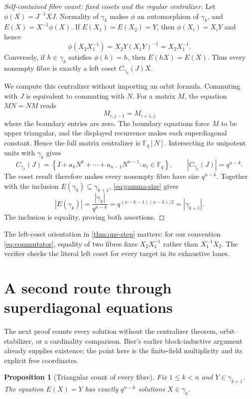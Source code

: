 \documentclass[10pt,a4paper]{amsart}
\newtheorem{proposition}[theorem]{Proposition}
\theoremstyle{definition}
\theoremstyle{remark}
\newcommand{\F}{\mathbb F}
\begin{document}
\begin{proof}[Self-contained fibre count: fixed cosets and the regular centralizer]
Let $\phi(X)=J^{-1}XJ$.  Normality of $\gamma_k$ makes $\phi$ an
automorphism of $\gamma_k$, and $E(X)=X^{-1}\phi(X)$.  If
$E(X_1)=E(X_2)=Y$, then $\phi(X_i)=X_iY$ and hence
\[
 \phi(X_2X_1^{-1})=X_2Y(X_1Y)^{-1}=X_2X_1^{-1}.
\]
Conversely, if $h\in\gamma_k$ satisfies $\phi(h)=h$, then
$E(hX)=E(X)$.  Thus every nonempty fibre is exactly a left coset
$C_{\gamma_k}(J)X$.

We compute this centralizer without importing an orbit formula.  Commuting
with $J$ is equivalent to commuting with $N$.  For a matrix $M$, the equation
$MN=NM$ reads
\[
                  M_{i,j-1}=M_{i+1,j}
\]
where the boundary entries are zero.  The boundary equations force $M$ to
be upper triangular, and the displayed recurrence makes each
superdiagonal constant.  Hence the full matrix centralizer is $\F_q[N]$.
Intersecting its unipotent units with $\gamma_k$ gives
\begin{equation}
 C_{\gamma_k}(J)
  =\left\{I+a_kN^k+\cdots+a_{n-1}N^{n-1}:a_i\in\F_q\right\},
 \qquad |C_{\gamma_k}(J)|=q^{n-k}.
 \label{eq:centralizer}
\end{equation}
The coset result therefore makes every nonempty fibre have size $q^{n-k}$.
Together with the inclusion $E(\gamma_k)\subseteq\gamma_{k+1}$,
\cref{eq:gamma-size} gives
\[
 |E(\gamma_k)|
  =\frac{|\gamma_k|}{q^{n-k}}
  =q^{(n-k-1)(n-k)/2}
  =|\gamma_{k+1}|.
\]
The inclusion is equality, proving both assertions.
\end{proof}

The left-coset orientation in \cref{thm:one-step} matters: for our
convention \eqref{eq:commutator}, equality of two fibres fixes
$X_2X_1^{-1}$ rather than $X_1^{-1}X_2$.  The verifier checks the literal
left coset for every target in its exhaustive lanes.

\section{A second route through superdiagonal equations}
\label{sec:triangular}

The next proof counts every solution without the centralizer theorem,
orbit--stabilizer, or a cardinality comparison.  Bier's earlier
block-inductive argument already supplies existence; the point here is the
finite-field multiplicity and its explicit free coordinates.

\begin{proposition}[Triangular count of every fibre]
\label{prop:triangular}
Fix $1\le k<n$ and $Y\in\gamma_{k+1}$.  The equation $E(X)=Y$ has exactly
$q^{n-k}$ solutions $X\in\gamma_k$.
\end{proposition}
\end{document}

